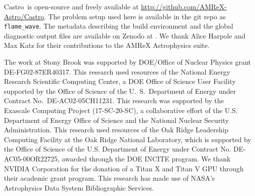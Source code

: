 \documentclass[twocolumn,times,tighten]{aastex631}
\newcommand{\castro}{{\sf Castro}}
\begin{document}
\begin{acknowledgements}
\castro\ is open-source and freely available at
\url{http://github.com/AMReX-Astro/Castro}.  The problem setup used
here is available in the git repo as {\tt flame\_wave}. The metadata
describing the build environment and the global diagnostic output
files are available on Zenodo at \citet{xrb_data}.  We thank Alice
Harpole and Max Katz for their contributions to the AMReX Astrophysics
suite.  

The work at Stony Brook was supported by DOE/Office of Nuclear
Physics grant DE-FG02-87ER40317.  This research used resources of the
National Energy Research Scientific Computing Center, a DOE Office of
Science User Facility supported by the Office of Science of the
U.~S.\ Department of Energy under Contract No.\ DE-AC02-05CH11231.
This research was supported by the Exascale Computing Project
(17-SC-20-SC), a collaborative effort of the U.S. Department of Energy
Office of Science and the National Nuclear Security Administration.
This research used resources of the Oak Ridge Leadership Computing
Facility at the Oak Ridge National Laboratory, which is supported by
the Office of Science of the U.S. Department of Energy under Contract
No. DE-AC05-00OR22725, awarded through the DOE INCITE program.  We
thank NVIDIA Corporation for the donation of a Titan X and Titan V GPU
through their academic grant program.  This research has made use of
NASA's Astrophysics Data System Bibliographic Services.
\end{acknowledgements}








\end{document}
